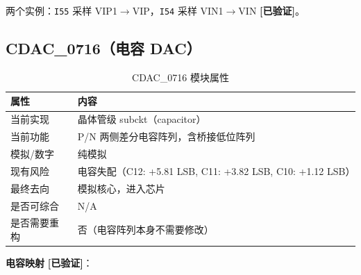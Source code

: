 \documentclass[UTF8,a4paper,11pt]{ctexart}
\newcommand{\verified}{\textcolor{verifiedgreen}{\textbf{[已验证]}}}
\begin{document}
两个实例：\texttt{I55} 采样 VIP1$\rightarrow$VIP，\texttt{I54} 采样 VIN1$\rightarrow$VIN \verified。

\subsection{CDAC\_0716（电容 DAC）}

\begin{table}[H]
\centering
\caption{CDAC\_0716 模块属性}
\label{tab:cdac-attr}
\begin{tabular}{ll}
\toprule
属性 & 内容 \\
\midrule
当前实现   & 晶体管级 subckt（capacitor） \\
当前功能   & P/N 两侧差分电容阵列，含桥接低位阵列 \\
模拟/数字  & 纯模拟 \\
现有风险   & 电容失配（C12: +5.81 LSB, C11: +3.82 LSB, C10: +1.12 LSB） \\
最终去向   & 模拟核心，进入芯片 \\
是否可综合 & N/A \\
是否需要重构 & 否（电容阵列本身不需要修改） \\
\bottomrule
\end{tabular}
\end{table}

\textbf{电容映射} \verified：
\end{document}
